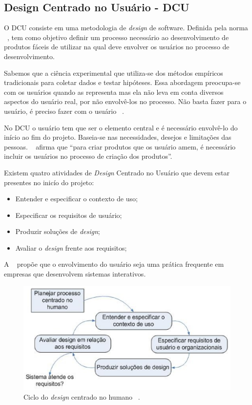 \subsection{Design Centrado no Usuário - DCU}

O DCU consiste em uma metodologia de \emph{design} de software. Definida pela norma ~, tem como objetivo definir um processo necessário ao desenvolvimento de produtos fáceis de utilizar na qual deve envolver os usuários no processo de desenvolvimento.

Sabemos que a ciência experimental que utiliza-se dos métodos empíricos tradicionais para coletar dados e testar hipóteses. Essa abordagem preocupa-se com os usuários quando as representa mas ela não leva em conta diversos aspectos do usuário real, por não envolvê-los no processo. Não basta fazer para o usuário, é preciso fazer com o usuário ~\cite{eason1995}. 

No DCU o usuário tem que ser o elemento central e é necessário envolvê-lo do início ao fim do projeto. Baseia-se nas necessidades, desejos e limitações das pessoas. ~ afirma que ``para criar produtos que os usuário amem, é necessário incluir os usuários no processo de criação dos produtos''. 


Existem quatro atividades de \emph{Design} Centrado no Usuário que devem estar presentes no inicío do projeto:

\begin{itemize}
\item Entender e especificar o contexto de uso;
\item Especificar os requisitos de usuário;
\item Produzir soluções de \emph{design};
\item Avaliar o \emph{design} frente aos requisitos;
\end{itemize}

A ~ propõe que o envolvimento do usuário seja uma prática frequente em empresas que desenvolvem sistemas interativos.

\begin{figure}[h]
    \centering
    \includegraphics[keepaspectratio=true,scale=0.60]
      {figuras/ciclo_iso13407.eps}
    \caption{Ciclo do \emph{design} centrado no humano ~\cite{iso:13407}.}
    \label{ciclo_iso13407}
\end{figure}

